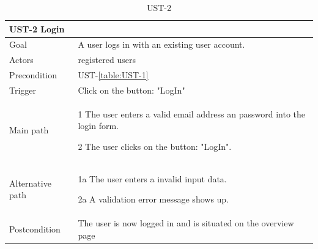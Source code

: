 \documentclass[titlepage, 12pt]{article}
\newenvironment{packed_itemize}{
  \vspace{-\topsep}
  \begin{itemize}
    \setlength{\itemsep}{1pt}
    \setlength{\parskip}{0pt}
    \setlength{\parsep}{0pt}
  }{\end{itemize}}
\begin{document}
\begin{table}[H]
  \begin{center}

    \begin{tabular}{p{4cm}|p{10cm}}
      \textbf{UST-2 Login}                                                              \\
      \hline
      Goal             & A user logs in with an existing user account.                  \\
      \hline
      Actors           & registered users                                               \\
      \hline
      Precondition     & UST-\ref{table:UST-1}                                          \\
      \hline
      Trigger          & Click on the button: "LogIn"                                   \\
      \hline
      Main path        &
      \begin{packed_itemize}
        \item [1] The user enters a valid email address an password into the login form.
        \item [2] The user clicks on the button: "LogIn".
      \end{packed_itemize}                                                         \\
      \hline
      Alternative path &
      \begin{packed_itemize}
        \item [1a] The user enters a invalid input data.
        \item [2a] A validation error message shows up.
      \end{packed_itemize}                                                         \\
      \hline
      Postcondition    & The user is now logged in and is situated on the overview page \\
    \end{tabular}

    \caption{UST-2}
    \label{table:UST-2}

  \end{center}
\end{table}
\end{document}
